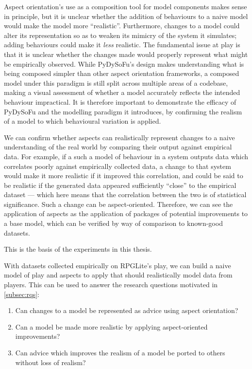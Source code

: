 Aspect orientation's use as a composition tool for model components makes sense
in principle, but it is unclear whether the addition of behaviours to a naive
model would make the model more ``realistic''. Furthermore, changes to a model
could alter its representation so as to weaken its mimicry of the system it
simulates; adding behaviours could make it \emph{less} realistic. The
fundamental issue at play is that it is unclear whether the changes made would
properly represent what might be empirically observed. While PyDySoFu's design
makes understanding what is being composed simpler than other aspect orientation
frameworks, a composed model under this paradigm is still split across multiple
areas of a codebase, making a visual assessment of whether a model accurately
reflects the intended behaviour impractical. It is therefore important to
demonstrate the efficacy of PyDySoFu and the modelling paradigm it introduces,
by confirming the realism of a model to which behavioural variation is applied.

We can confirm whether aspects can realistically represent changes to a naive
understanding of the real world by comparing their output against empirical
data. For example, if a such a model of behaviour in a system outputs data which
correlates poorly against empirically collected data, a change to that system
would make it more realistic if it improved this correlation, and could be said
to be realistic if the generated data appeared sufficiently ``close'' to the
empirical dataset --- which here means that the correlation between the two is
of statistical significance. Such a change can be aspect-oriented. Therefore, we
can see the application of aspects as the application of packages of potential
improvements to a base model, which can be verified by way of comparison to
known-good datasets.

This is the basis of the experiments in this thesis.

With datasets collected empirically on RPGLite's play, we can build a naive
model of play and aspects to apply that should realistically model data from
players. This can be used to answer the research questions motivated in
\cref{subsec:rqs}:

\begin{researchquestion}
  \begin{enumerate}
    \item Can changes to a model be represented as advice using aspect orientation?
    \item Can a model be made more realistic by applying aspect-oriented improvements?
    \item Can advice which improves the realism of a model be ported to others without loss of realism?
  \end{enumerate}
\end{researchquestion}

